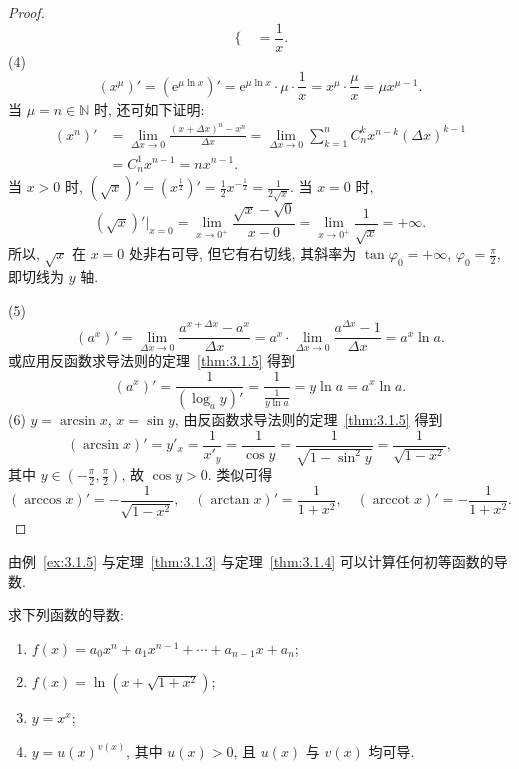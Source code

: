 \begin{proof}
\[\begin{cases}
\end{cases} = \frac{1}{x}.
\]
(4)
\[
(x^\mu)' = (\mathrm{e}^{\mu\ln x})' = \mathrm{e}^{\mu\ln x}\cdot\mu\cdot\frac{1}{x} = x^\mu\cdot\frac{\mu}{x} = \mu x^{\mu-1}.
\]
当 $\mu = n \in \mathbb{N}$ 时, 还可如下证明:
\[
\begin{aligned}
(x^n)' &= \lim_{\Delta x\to0}\frac{(x+\Delta x)^n - x^n}{\Delta x} = \lim_{\Delta x\to0}\sum_{k=1}^{n}C_n^k x^{n-k}(\Delta x)^{k-1}\\
&= C_n^1 x^{n-1} = nx^{n-1}.
\end{aligned}
\]
当 $x > 0$ 时, $(\sqrt{x})' = (x^{\frac{1}{2}})' = \frac{1}{2}x^{-\frac{1}{2}} = \frac{1}{2\sqrt{x}}$. 当 $x = 0$ 时,
\[
(\sqrt{x})'|_{x=0} = \lim_{x\to0^+}\frac{\sqrt{x} - \sqrt{0}}{x - 0} = \lim_{x\to0^+}\frac{1}{\sqrt{x}} = +\infty.
\]
所以, $\sqrt{x}$ 在 $x=0$ 处非右可导, 但它有右切线, 其斜率为 $\tan\varphi_0 = +\infty$, $\varphi_0 = \frac{\pi}{2}$, 即切线为 $y$ 轴.

(5)
\[
(a^x)' = \lim_{\Delta x\to0}\frac{a^{x+\Delta x} - a^x}{\Delta x} = a^x\cdot\lim_{\Delta x\to0}\frac{a^{\Delta x} - 1}{\Delta x} = a^x\ln a.
\]
或应用反函数求导法则的定理~\ref{thm:3.1.5} 得到
\[
(a^x)' = \frac{1}{(\log_a y)'} = \frac{1}{\frac{1}{y\ln a}} = y\ln a = a^x\ln a.
\]
(6) $y = \arcsin x$, $x = \sin y$, 由反函数求导法则的定理~\ref{thm:3.1.5} 得到
\[
(\arcsin x)' = y'_x = \frac{1}{x'_y} = \frac{1}{\cos y} = \frac{1}{\sqrt{1-\sin^2 y}} = \frac{1}{\sqrt{1-x^2}},
\]
其中 $y \in \left(-\frac{\pi}{2}, \frac{\pi}{2}\right)$, 故 $\cos y > 0$. 类似可得
\[
(\arccos x)' = -\frac{1}{\sqrt{1-x^2}},\quad (\arctan x)' = \frac{1}{1+x^2},\quad (\operatorname{arccot} x)' = -\frac{1}{1+x^2}.
\]
\end{proof}

由例~\ref{ex:3.1.5} 与定理~\ref{thm:3.1.3} 与定理~\ref{thm:3.1.4} 可以计算任何初等函数的导数.

\begin{example}\label{ex:3.1.6}
求下列函数的导数:
\begin{enumerate}[label=(\arabic*)]
  \item $f(x) = a_0 x^n + a_1 x^{n-1} + \cdots + a_{n-1}x + a_n$;
  \item $f(x) = \ln(x + \sqrt{1+x^2})$;
  \item $y = x^x$;
  \item $y = u(x)^{v(x)}$, 其中 $u(x) > 0$, 且 $u(x)$ 与 $v(x)$ 均可导.
\end{enumerate}
\end{example}

